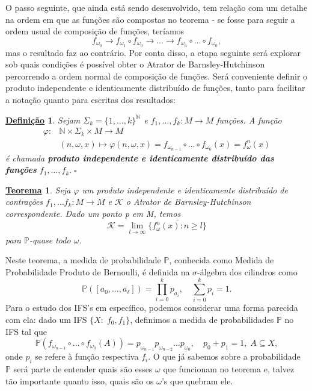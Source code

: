 \documentclass[12pt]{article}
\newtheorem*{def*}{\underline{Definição}}
\newtheorem*{theorem*}{\underline{Teorema}}
\theoremstyle{definition}
\begin{document}
O passo seguinte, que ainda está sendo desenvolvido, tem relação com um detalhe na ordem em que as funções são compostas no teorema - se fosse para seguir a ordem
usual de composição de funções, teríamos
\[
	f_{\omega_{0}}\rightarrow f_{\omega_{1}}\circ f_{\omega_{0}}\rightarrow \dotsc \rightarrow f_{\omega_{n}}\circ \dotsc \circ f_{\omega_{0}},
\]
mas o resultado faz ao contrário. Por conta disso, a etapa seguinte será explorar sob quais condições é possível obter o Atrator de Barnsley-Hutchinson percorrendo a ordem normal de composição de funções. Será conveniente definir o produto independente e identicamente distribuído de funções, tanto para facilitar a notação quanto para escritas dos resultados:
\begin{def*}
	Sejam \(\Sigma_{k}  = \{1, \dotsc , k\}^{\mathbb{N}}\) e \(f_1, \dotsc, f_{k}:M\rightarrow M\) funções. A função
	\begin{align*}
		\varphi : & \mathbb{N}\times \Sigma_{k} \times M\rightarrow M                                                                             \\
		          & (n ,\omega , x)\longmapsto \varphi(n, \omega , x) = f_{\omega_{n-1}}\circ \dotsc \circ f_{\omega_{0}}(x) = f_{\omega }^{n}(x)
	\end{align*}
	é chamada \textbf{produto independente e identicamente distribuído das funções }\(f_1, \dotsc , f_{k}.\; \square\)
\end{def*}
\begin{theorem*}
	Seja \(\varphi \) um produto independente e identicamente distribuído de contrações \(f_{1},\dotsc f_{k}:M\rightarrow M\) e \(\mathcal{K}\) o Atrator de Barnsley-Hutchinson correspondente. Dado um
	ponto p em M, temos
	\[
		\mathcal{K}=\lim_{l\to \infty}\overline{\{f_{\omega }^{n}(x): n\geq l\}}
	\]
	para \(\mathbb{P}\)-quase todo \(\omega \).
\end{theorem*}
Neste teorema, a medida de probabilidade \(\mathbb{P}\), conhecida como Medida de Probabilidade Produto de Bernoulli, é definida na \(\sigma \)-álgebra dos cilindros como
\[
	\mathbb{P}([a_{0}, \dotsc, a_{\ell}]) = \prod_{i=0}^{k}p_{a_i}, \quad \sum_{i=0}^{k}p_{i} = 1.
\]
Para o estudo dos IFS's em específico, podemos considerar uma forma parecida com ela: dado um IFS \(\{X:\; f_{0}, f_{1}\}\), definimos a medida de probabilidades \(\mathbb{P}\) no IFS tal que
\[
	\mathbb{P}(f_{\omega_{n-1}}\circ \dotsc \circ f_{\omega_{0}}(A)) = p_{\omega_{n-1}}p_{\omega_{n-2}}\dotsc p_{\omega_{0}},\quad p_{0} + p_{1} = 1,\; A\subseteq X,
\]
onde \(p_{i}\) se refere à função respectiva \(f_{i}\).
O que já sabemos sobre a probabilidade \(\mathbb{P}\) será parte de entender quais são esses \(\omega \) que funcionam no teorema e, talvez tão importante quanto isso, quais são os \(\omega \)'s que quebram ele.
\end{document}
